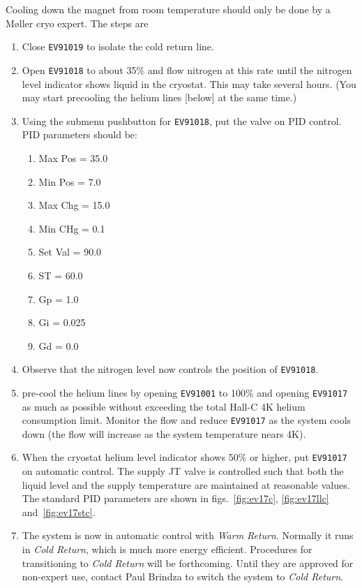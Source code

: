 Cooling down the magnet from room temperature should only be done
by a M\o ller cryo expert. The steps are
\begin{enumerate}
	\item Close {\tt EV91019} to isolate the cold return line.
	\item Open {\tt EV91018} to about 35\% and flow nitrogen at this rate
		until the nitrogen level indicator shows liquid in the cryostat.
		This may take several hours. (You may start precooling the helium
		lines [below] at the same time.)
	\item Using the submenu pushbutton for {\tt EV91018}, put the valve on
		PID control. PID parameters should be:
	\begin{enumerate}
		\item Max Pos = 35.0
		\item Min Pos = 7.0
		\item Max Chg = 15.0
		\item Min CHg = 0.1
		\item Set Val = 90.0
		\item ST = 60.0
		\item Gp = 1.0
		\item Gi = 0.025
		\item Gd = 0.0
	\end{enumerate}
	\item Observe that the nitrogen level now controls the position of {\tt EV91018}.
	\item pre-cool the helium lines by opening {\tt EV91001} to 100\% and
		opening {\tt EV91017} as much as possible without exceeding the total
		Hall-C 4K helium consumption limit. Monitor the flow and 
		reduce {\tt EV91017} as the system cools down (the flow will 
		increase as the system temperature nears 4K).
	\item When the cryostat helium level indicator shows 50\% or higher, put
		{\tt EV91017} on automatic control. The supply JT valve is controlled 
		such that both the liquid level and the supply temperature are maintained
		at reasonable values. The standard PID parameters are shown in 
		figs.~\ref{fig:ev17c}, \ref{fig:ev17llc} and~\ref{fig:ev17stc}.
	\item The system is now in automatic control with {\it Warm Return}. Normally it
		runs in {\it Cold Return}, which is much more energy efficient. Procedures
		for transitioning to {\it Cold Return} will be forthcoming. Until they
		are approved for non-expert use, contact Paul Brindza to switch the
		system to {\it Cold Return}.
\end{enumerate}

